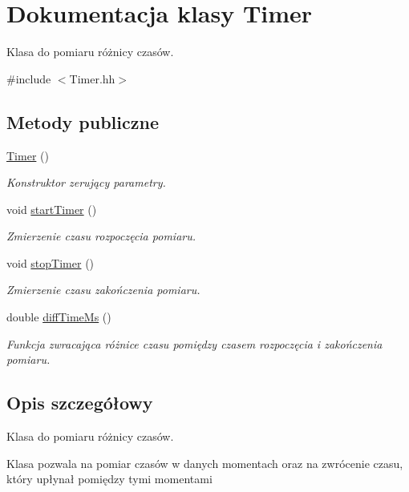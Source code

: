 \hypertarget{class_timer}{\section{Dokumentacja klasy Timer}
\label{class_timer}
}


Klasa do pomiaru różnicy czasów.  




{\ttfamily \#include $<$Timer.\-hh$>$}

\subsection*{Metody publiczne}
\begin{DoxyCompactItemize}
\item 
\hyperlink{class_timer_a5f16e8da27d2a5a5242dead46de05d97}{Timer} ()
\begin{DoxyCompactList}\small\item\em Konstruktor zerujący parametry. \end{DoxyCompactList}\item 
void \hyperlink{class_timer_aa8c887576ec3b0d68c10ebf4097c367c}{start\-Timer} ()
\begin{DoxyCompactList}\small\item\em Zmierzenie czasu rozpoczęcia pomiaru. \end{DoxyCompactList}\item 
void \hyperlink{class_timer_a27f97da1b1d19ad74a847703ca25c455}{stop\-Timer} ()
\begin{DoxyCompactList}\small\item\em Zmierzenie czasu zakończenia pomiaru. \end{DoxyCompactList}\item 
double \hyperlink{class_timer_afa5d5cd3dab1aa6a67278dffd6a42dbf}{diff\-Time\-Ms} ()
\begin{DoxyCompactList}\small\item\em Funkcja zwracająca różnice czasu pomiędzy czasem rozpoczęcia i zakończenia pomiaru. \end{DoxyCompactList}\end{DoxyCompactItemize}


\subsection{Opis szczegółowy}
Klasa do pomiaru różnicy czasów. 

Klasa pozwala na pomiar czasów w danych momentach oraz na zwrócenie czasu, który upłynał pomiędzy tymi momentami 

